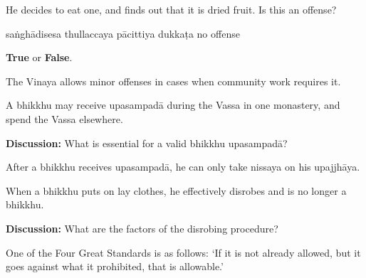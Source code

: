 \begin{exam}{\autoExamName}
\begin{problem*}
\begin{parts}
    \bigskip

    \item He decides to eat one, and finds out that it is dried fruit. Is this an offense?

    \bigskip

    \begin{answers}{5}
      \bChoices
       saṅghādisesa\eAns
       thullaccaya\eAns
       pācittiya\eAns
       dukkaṭa\eAns
       no offense\eAns
      \eChoices
    \end{answers}

  \end{parts}

\end{problem*}

\problemDivide

\begin{problem*}

  \textbf{True} or \textbf{False}.

  \bigskip

  \begin{parts}

    \item {} The Vinaya allows minor offenses in cases when community work requires it.

    \bigskip

    \item {} A bhikkhu may receive upasampadā during the Vassa in one
    monastery, and spend the Vassa elsewhere.

    \bigskip

    \textbf{Discussion:} What is essential for a valid bhikkhu upasampadā?

    \bigskip

    \item {} After a bhikkhu receives upasampadā, he can only take nissaya
    on his upajjhāya.

    \bigskip

    \item {} When a bhikkhu puts on lay clothes, he effectively disrobes and
    is no longer a bhikkhu.

    \bigskip

    \textbf{Discussion:} What are the factors of the disrobing procedure?

    \bigskip

    \item {} One of the Four Great Standards is as follows: `If it is not
    already allowed, but it goes against what it prohibited, that is allowable.'


\end{parts}
\end{problem*}
\end{exam}
